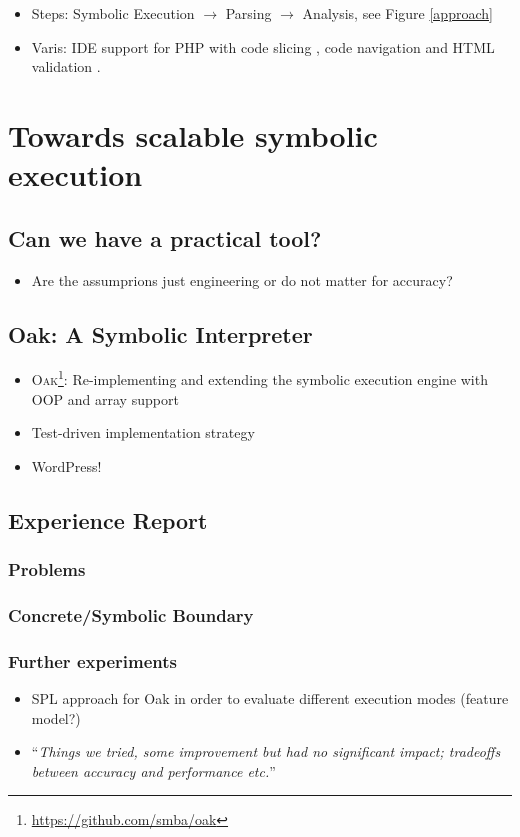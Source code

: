 \documentclass{sig-alternate-05-2015}
\begin{document}
\begin{itemize}
  \item Steps: Symbolic Execution $\rightarrow$ Parsing $\rightarrow$
  Analysis, see Figure \ref{approach}
  \item Varis: IDE support \cite{Nguyen:2015:VIS:2819009.2819140} for PHP with
  code slicing \cite{Nguyen:2015:CPS:2786805.2786872}, code navigation
  \cite{Nguyen:2014:BCG:2635868.2635928} and
  HTML validation \cite{Nguyen:2011:AFH:2190078.2190142}.
\end{itemize}

\section{Towards scalable symbolic execution}
\subsection{Can we have a practical tool?}
\begin{itemize}
  \item Are the assumprions just engineering or do not matter for accuracy? 
\end{itemize}
\subsection{Oak: A Symbolic Interpreter}
\begin{itemize}
  \item \textsc{Oak}\footnote{\url{https://github.com/smba/oak}}:
  Re-implementing and extending the symbolic execution engine with OOP and array support
  \item Test-driven implementation strategy 
  \item WordPress!
\end{itemize}
\subsection{Experience Report}
\subsubsection{Problems}
\subsubsection{Concrete/Symbolic Boundary}
\subsubsection{Further experiments}
\begin{itemize}
  \item SPL approach for Oak in order to evaluate different execution modes
  (feature model?)
  \item ``\emph{Things we tried, some improvement but had no significant impact;
  tradeoffs between accuracy and performance etc.}''
\end{itemize}
\end{document}
